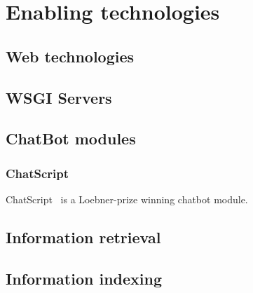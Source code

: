 \chapter{Enabling technologies}
\label{chap:enabling}

\section{Web technologies}

\section{WSGI Servers}

\section{ChatBot modules}

\subsection{ChatScript}
\label{subsec:chatscript}

ChatScript~\cite{wilcox2013} is a Loebner-prize winning chatbot module.

\section{Information retrieval}

\section{Information indexing}

